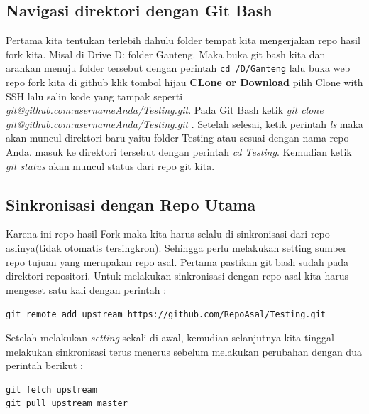 \subsection{Navigasi direktori dengan Git Bash}
Pertama kita tentukan terlebih dahulu folder tempat kita mengerjakan repo hasil fork kita. Misal di Drive D: folder Ganteng. Maka buka git bash kita dan arahkan menuju folder tersebut dengan perintah 
\verb|cd /D/Ganteng| 
lalu buka web repo fork kita di github klik tombol hijau \textbf{CLone or Download} pilih Clone with SSH lalu salin kode yang tampak seperti \textit{git@github.com:usernameAnda/Testing.git}. Pada Git Bash ketik \textit{git clone git@github.com:usernameAnda/Testing.git} . Setelah selesai, ketik perintah \textit{ls} maka akan muncul direktori baru yaitu folder Testing atau sesuai dengan nama repo Anda. masuk ke direktori tersebut dengan perintah \textit{cd Testing}. Kemudian ketik \textit{git status} akan muncul status dari repo git kita.

\subsection{Sinkronisasi dengan Repo Utama}
Karena ini repo hasil Fork maka kita harus selalu di sinkronisasi dari repo aslinya(tidak otomatis tersingkron). Sehingga perlu melakukan setting sumber repo tujuan yang merupakan repo asal. Pertama pastikan git bash sudah pada direktori repositori. Untuk melakukan sinkronisasi dengan repo asal kita harus mengeset satu kali dengan perintah :

\verb|git remote add upstream https://github.com/RepoAsal/Testing.git|

Setelah melakukan \textit{setting} sekali di awal, kemudian selanjutnya kita tinggal melakukan sinkronisasi terus menerus sebelum melakukan perubahan dengan dua perintah berikut :
\begin{verbatim}
git fetch upstream
git pull upstream master
\end{verbatim}


